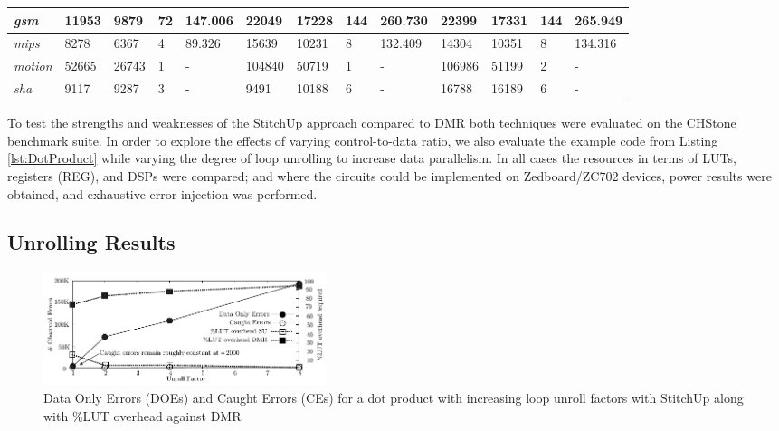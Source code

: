 \begin{table}[t]
\begin{tabular}{@{}|l|l|l|l|l|l|l|l|l|l|l|l|l|@{}}
\textit{gsm}        & 11953        & 9879         & 72           & 147.006        & 22049        & 17228        & 144          & 260.730        & 22399        & 17331        & 144          & 265.949        \\ \midrule
\textit{mips}       & 8278         & 6367         & 4            & 89.326         & 15639        & 10231        & 8            & 132.409        & 14304        & 10351        & 8            & 134.316        \\ \midrule
\textit{motion}     & 52665        & 26743        & 1            & -              & 104840       & 50719        & 1            & -              & 106986       & 51199        & 2            & -              \\ \midrule
\textit{sha}        & 9117         & 9287         & 3            & -              & 9491         & 10188        & 6            & -              & 16788        & 16189        & 6            & -               \\ \bottomrule
\end{tabular}
\end{table}

To test the strengths and weaknesses of the StitchUp approach compared to DMR both techniques were evaluated on the CHStone benchmark suite.
In order to explore the effects of varying control-to-data ratio, we also evaluate the example code from 
Listing \ref{lst:DotProduct} while varying the degree of loop unrolling to increase data parallelism.
In all cases the resources in terms of LUTs, registers (REG), and DSPs were compared; and where the circuits could be implemented
on Zedboard/ZC702 devices, power results were obtained, and exhaustive error injection was performed.

\subsection{Unrolling Results}
\begin{figure}[t]
\centering
\includegraphics[width=3.25in]{./graphs/dp_unrolling_res_v1_1.pdf}
\caption{Data Only Errors (DOEs) and Caught Errors (CEs) for a dot product with increasing loop unroll factors with StitchUp along with \%LUT overhead against DMR}
\label{fig:dp_unrolling_res}
\end{figure}

